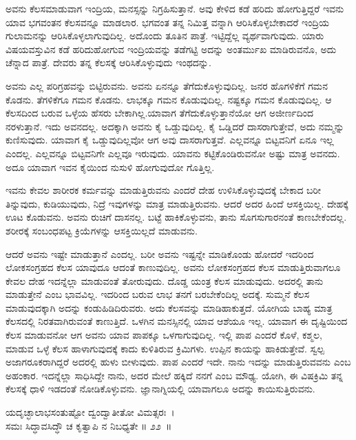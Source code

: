 ಅವನು ಕೆಲಸಮಾಡುವಾಗ ಇಂದ್ರಿಯ, ಮನಸ್ಸನ್ನು ನಿಗ್ರಹಿಸುತ್ತಾನೆ. ಅವು ಕೇಳಿದ ಕಡೆ ಹರಿದು ಹೋಗುತ್ತಿದ್ದರೆ ಇವನು ಯಾವ ಭಗವಂತನ ಕೆಲಸವನ್ನೂ ಮಾಡಲಾರ. ಭಗವಂತ ತನ್ನ ನಿಮಿತ್ತ ವನ್ನಾಗಿ ಆರಿಸಿಕೊಳ್ಳಬೇಕಾದರೆ ಇಂದ್ರಿಯ ಗುಲಾಮನನ್ನು ಆರಿಸಿಕೊಳ್ಳಲಾಗುವುದಿಲ್ಲ. ಅದೊಂದು ತೂತಿನ ಪಾತ್ರೆ. ಇಟ್ಟಿದ್ದೆಲ್ಲ ವ್ಯರ್ಥವಾಗುವುದು. ಯಾರು ವಿಷಯವಸ್ತುವಿನ ಕಡೆ ಹರಿದುಹೋಗುವ ಇಂದ್ರಿಯವನ್ನು ತಡೆಗಟ್ಟಿ ಅದನ್ನು ಅಂತರ್ಮುಖ ಮಾಡಿರುವನೊ, ಅದು ಚೆನ್ನಾದ ಪಾತ್ರೆ. ದೇವರು ತನ್ನ ಕೆಲಸಕ್ಕೆ ಆರಿಸಿಕೊಳ್ಳುವುದು ಇಂಥದನ್ನು.

ಅವನು ಎಲ್ಲ ಪರಿಗ್ರಹವನ್ನು ಬಿಟ್ಟಿರುವನು. ಅವನು ಏನನ್ನೂ ತೆಗೆದುಕೊಳ್ಳುವುದಿಲ್ಲ. ಜನರ ಹೊಗಳಿಕೆಗೆ ಗಮನ ಕೊಡನು. ತೆಗಳಿಕೆಗೂ ಗಮನ ಕೊಡನು. ಲಾಭಕ್ಕೂ ಗಮನ ಕೊಡುವುದಿಲ್ಲ. ನಷ್ಟಕ್ಕೂ ಗಮನ ಕೊಡುವುದಿಲ್ಲ. ಆ ಕೆಲಸದಿಂದ ಬರುವ ಒಳ್ಳೆಯ ಹೆಸರು ಬೇಕಾಗಿಲ್ಲ.\break ಯಾವಾಗ ತೆಗೆದುಕೊಳ್ಳುತ್ತಾನೆಯೋ ಆಗ ಅಜೀರ್ಣದಿಂದ ನರಳುತ್ತಾನೆ. ಇದು ಅವನದಲ್ಲ. ಅದಕ್ಕಾಗಿ ಅವನು ಕೈ ಒಡ್ಡುವುದಿಲ್ಲ. ಕೈ ಒಡ್ಡಿದರೆ ದಾಸರಾಗುತ್ತೇವೆ, ಅದು ನಮ್ಮನ್ನು ಕುಣಿಸುವುದು. ಯಾವಾಗ ಕೈ ಒಡ್ಡುವುದಿಲ್ಲವೋ ಆಗ ಅವು ದಾಸರಾಗುತ್ತವೆ. ಎಲ್ಲವನ್ನೂ ಬಿಟ್ಟವನಿಗೆ ಏನೂ ಇಲ್ಲ ಎಂದಲ್ಲ. ಎಲ್ಲವನ್ನೂ ಬಿಟ್ಟವನಿಗೇ ಎಲ್ಲವೂ ಇರುವುದು. ಯಾವನು ಕಟ್ಟಿಕೊಂಡಿರುವನೋ ಅಷ್ಟು ಮಾತ್ರ ಅವನದು. ಅದೂ ಯಾವಾಗ ಇವನ ಕೈಯಿಂದ ನುಸುಳಿ ಹೋಗುವುದೋ ಗೊತ್ತಿಲ್ಲ.

ಇವನು ಕೇವಲ ಶಾರೀರಕ ಕರ್ಮವನ್ನು ಮಾಡುತ್ತಿರುವನು ಎಂದರೆ ದೇಹ ಉಳಿಸಿಕೊಳ್ಳು\-ವುದಕ್ಕೆ ಬೇಕಾದ ಬರೀ ತಿನ್ನುವುದು, ಕುಡಿಯುವುದು, ನಿದ್ರೆ ಇವುಗಳನ್ನು ಮಾತ್ರ ಮಾಡುತ್ತಿರುವನು. ಆದರೆ ಅದರ ಹಿಂದೆ ಆಸಕ್ತಿಯಿಲ್ಲ. ದೇಹಕ್ಕೆ ಊಟ ಕೊಡುವನು. ಅವನು ರುಚಿಗೆ ದಾಸನಲ್ಲ. ಬಟ್ಟೆ ಹಾಕಿಕೊಳ್ಳುವನು, ತಾನು ಸೊಗಸುಗಾರನಂತೆ ಕಾಣಬೇಕೆಂದಲ್ಲ. ಶರೀರಕ್ಕೆ ಸಂಬಂಧಪಟ್ಟ ಕ್ರಿಯೆಗಳನ್ನು ಆಸಕ್ತಿಯಿಲ್ಲದೆ ಮಾಡುವನು.

ಆದರೆ ಅವನು ಇಷ್ಟೇ ಮಾಡುತ್ತಾನೆ ಎಂದಲ್ಲ. ಬರೀ ಅವನು ಇಷ್ಟನ್ನೇ ಮಾಡಿಕೊಂಡು ಹೋದರೆ ಇದರಿಂದ ಲೋಕಸಂಗ್ರಹದ ಕೆಲಸ ಯಾವುದೂ ಆದಂತೆ ಕಾಣುವುದಿಲ್ಲ. ಅವನು ಲೋಕಸಂಗ್ರಹದ ಕೆಲಸ ಮಾಡುತ್ತಿರುವಾಗಲೂ ಕೇವಲ ದೇಹ ಇದನ್ನೆಲ್ಲಾ ಮಾಡುವಂತೆ ತೋರುವುದು. ದೊಡ್ಡ ಯಂತ್ರ ಕೆಲಸ ಮಾಡುವುದು. ಅದರಲ್ಲಿ ತಾನು ಮಾಡುತ್ತೇನೆ ಎಂಬ ಭಾವವಿಲ್ಲ. ಇದರಿಂದ ಬರುವ ಲಾಭ ತನಗೆ ಬರಬೇಕೆಂದಿಲ್ಲ ಅದಕ್ಕೆ. ಸುಮ್ಮನೆ ಕೆಲಸ ಮಾಡುವುದಕ್ಕಾಗಿ ಅದನ್ನು ಕಂಡುಹಿಡಿದಿರುವರು. ಅದು ಕೆಲಸವನ್ನು ಮಾಡಿಹಾಕುತ್ತದೆ. ಯೋಗಿಯ ಬಾಹ್ಯ ಮಾತ್ರ ಕೆಲಸದಲ್ಲಿ ನಿರತವಾಗಿರುವಂತೆ ಕಾಣುತ್ತಿದೆ. ಒಳಗಿನ ಮನಸ್ಸಿನಲ್ಲಿ ಯಾವ ಆಶೆಯೂ ಇಲ್ಲ. ಯಾವಾಗ ಈ ದೃಷ್ಟಿಯಿಂದ ಕೆಲಸ ಮಾಡುವನೋ ಆಗ ಅವನು ಯಾವ ಪಾಪಕ್ಕೂ ಒಳಗಾಗುವುದಿಲ್ಲ. ಇಲ್ಲಿ ಪಾಪ ಎಂದರೆ ಕೊಳೆ, ಕಶ್ಮಲ, ಮಾಡುವ ಒಳ್ಳೆ ಕೆಲಸ ಹಾಳಾಗುವುದಕ್ಕೆ ಕಾದು ಕುಳಿತಿರುವ ಕ್ರಿಮಿಗಳು. ಉಪ್ಪಿನ ಕಾಯನ್ನು ಹಾಕಿಡುತ್ತೇವೆ. ಸ್ವಲ್ಪ ಅಜಾಗರೂಕರಾಗಿದ್ದರೆ ಅದರಲ್ಲಿ ಹುಳು ಬೀಳುವುದು. ಪಾಪ ಎಂದರೆ ಇದೇ. ನಾನು ಇದನ್ನು ಮಾಡುತ್ತಿರುವವನು ಎಂಬ ಅಹಂಕಾರ. ಇದನ್ನೆಲ್ಲಾ ಸಾಧಿಸಿದ್ದೇ ನಾನು, ಅದರ ಮೇಲೆ ಹಕ್ಕಿದೆ ನನಗೆ ಎಂಬ ಮೌಢ್ಯ. ಯೋಗಿ, ಈ ವಿಷಕ್ರಿಮಿ ತನ್ನ ಕೆಲಸಕ್ಕೆ ಧಾಳಿ ಇಡದಂತೆ ನೋಡಿಕೊಳ್ಳುವನು. ಜ್ಞಾನಾಗ್ನಿಯಲ್ಲಿ ಯಾವಾಗಲೂ ಅದನ್ನು ಕಾಯಿಸುತ್ತಿರುವನು.

\begin{shloka}
ಯದೃಚ್ಛಾಲಾಭಸಂತುಷ್ಟೋ ದ್ವಂದ್ವಾತೀತೋ ವಿಮತ್ಸರಃ~।\\ಸಮಃ ಸಿದ್ಧಾವಸಿದ್ಧೌ ಚ ಕೃತ್ವಾಪಿ ನ ನಿಬಧ್ಯತೇ \hfill॥ ೨೨~॥
\end{shloka}

